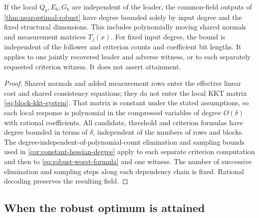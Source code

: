 \begin{corollary}
\label{cor:robust-degree}
If the local $Q_b,E_b,G_b$ are independent of the leader, the common-field
outputs of \cref{thm:nearoptimal-robust} have degree bounded solely by
input degree and the fixed structural dimensions. This includes
polynomially moving shared normals and measurement matrices $T_j(x)$.
For fixed input degree, the bound is independent of the follower and
criterion counts and coefficient bit lengths. It applies to one jointly
recovered leader and adverse witness, or to each separately requested
criterion witness. It does not assert attainment.
\end{corollary}
\begin{proof}
Shared normals and added measurement rows enter the effective linear
cost and shared consistency equations; they do not enter the local KKT
matrix \eqref{eq:block-kkt-system}. That matrix is constant under the
stated assumptions, so each local response is polynomial in the
compressed variables of degree $O(\delta)$ with rational coefficients.
All candidate, threshold and criterion formulas have degree bounded
in terms of $\delta$, independent of the numbers of rows and blocks.
The degree-independent-of-polynomial-count elimination and sampling
bounds used in \cref{cor:constant-hessian-degree} apply to each separate
criterion computation and then to \eqref{eq:robust-worst-formula} and
one witness. The number of successive elimination and sampling steps along each
dependency chain is fixed. Rational
decoding preserves the resulting field.
\end{proof}

\subsection{When the robust optimum is attained}\label{subsec:robust-attainment}

